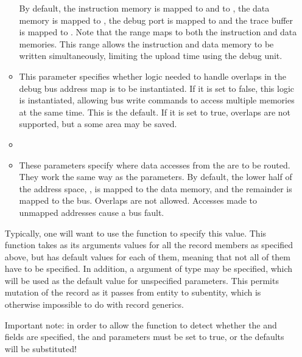 \begin{itemize}
\begin{itemize}
By default, the instruction memory is mapped to  
and to , the data memory is mapped to 
, the \rvex{} debug port is mapped to
 and the trace buffer is mapped to
. Note that the range 
maps to both the instruction and data memories. This range allows the
instruction and data memory to be written simultaneously, limiting the upload
time using the debug unit.

\item {}

This parameter specifies whether logic needed to handle overlaps in the debug 
bus address map is to be instantiated. If it is set to false, this logic is 
instantiated, allowing bus write commands to access multiple memories at the 
same time. This is the default. If it is set to true, overlaps are not
supported, but a some area may be saved.

\item {}
\item {}

These parameters specify where data accesses from the \rvex{} are to be routed.
They work the same way as the  parameters. By default, the
lower half of the address space, , is mapped to the
data memory, and the remainder is mapped to the bus. Overlaps are not allowed.
Accesses made to unmapped addresses cause a bus fault.

\end{itemize}

\noindent Typically, one will want to use the  function to
specify this value. This function takes as its arguments values for all the
record members as specified above, but has default values for each of them,
meaning that not all of them have to be specified. In addition, a 
argument of type  may be specified, which will be
used as the default value for unspecified parameters. This permits mutation of
the  record as it passes from entity to subentity, which is otherwise
impossible to do with record generics.

Important note: in order to allow the function to detect whether the  
and  fields are specified, the  and 
 parameters must be set to true, or the defaults will 
be substituted!


\end{itemize}
